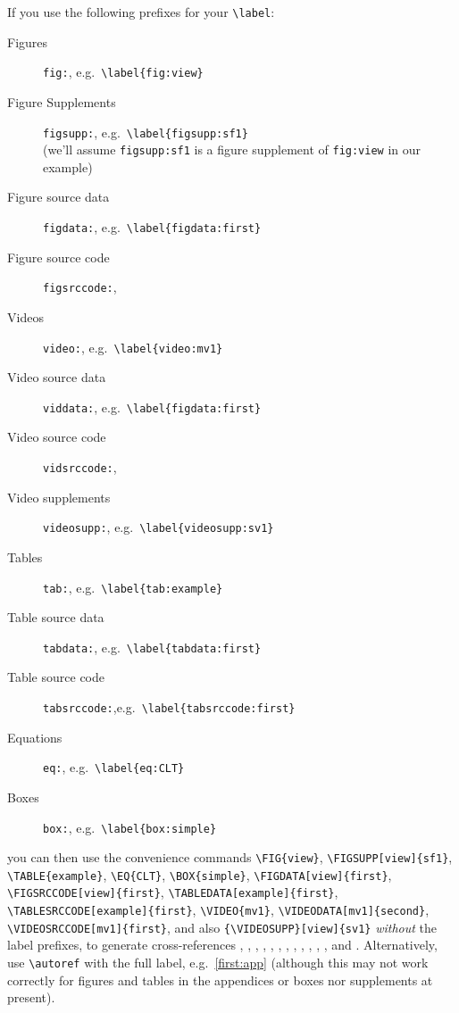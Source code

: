 \documentclass[9pt,lineno]{elife}
\begin{document}
If you use the following prefixes for your \verb|\label|:
%
\begin{description}
\item[Figures] \texttt{fig:}, e.g.~\verb|\label{fig:view}|
\item[Figure Supplements] \texttt{figsupp:}, e.g.~\verb|\label{figsupp:sf1}|\\
(we'll assume \texttt{figsupp:sf1} is a figure supplement of \texttt{fig:view} in our example)
\item[Figure source data] \texttt{figdata:}, e.g.~\verb|\label{figdata:first}|
\item[Figure source code] \texttt{figsrccode:},
\item[Videos] \texttt{video:}, e.g.~\verb|\label{video:mv1}|
\item[Video source data] \texttt{viddata:}, e.g.~\verb|\label{figdata:first}|
\item[Video source code] \texttt{vidsrccode:},
\item[Video supplements] \texttt{videosupp:}, e.g.~\verb|\label{videosupp:sv1}|
\item[Tables] \texttt{tab:}, e.g.~\verb|\label{tab:example}|
\item[Table source data] \texttt{tabdata:}, e.g.~\verb|\label{tabdata:first}|
\item[Table source code] \texttt{tabsrccode:},e.g.~\verb|\label{tabsrccode:first}|
\item[Equations] \texttt{eq:}, e.g.~\verb|\label{eq:CLT}|
\item[Boxes] \texttt{box:}, e.g.~\verb|\label{box:simple}|
\end{description}
%
you can then use the convenience commands \verb|\FIG{view}|, \verb|\FIGSUPP[view]{sf1}|, \verb|\TABLE{example}|, \verb|\EQ{CLT}|, \verb|\BOX{simple}|, \verb|\FIGDATA[view]{first}|, \verb|\FIGSRCCODE[view]{first}|, 
\verb|\TABLEDATA[example]{first}|, \verb|\TABLESRCCODE[example]{first}|,
\verb|\VIDEO{mv1}|,
\verb|\VIDEODATA[mv1]{second}|, 
\verb|\VIDEOSRCCODE[mv1]{first}|,
and also \verb|{\VIDEOSUPP}[view]{sv1}| \emph{without} the label prefixes, to generate cross-references 
, ,  
, , 
, 
, 
, 
, 
,
, 
, 
,
and . 
Alternatively, use \verb|\autoref| with the full label, e.g.~\autoref{first:app} (although this may not work correctly for figures and tables in the appendices or boxes nor supplements at present).
\end{document}
